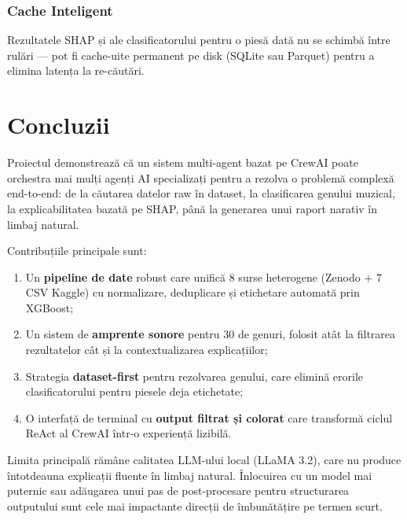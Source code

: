 \documentclass[12pt,a4paper]{report}
\begin{document}
\subsection{Cache Inteligent}

Rezultatele SHAP și ale clasificatorului pentru o piesă dată nu se schimbă
între rulări — pot fi cache-uite permanent pe disk (SQLite sau Parquet) pentru
a elimina latența la re-căutări.

\chapter{Concluzii}

Proiectul demonstrează că un sistem multi-agent bazat pe CrewAI poate orchestra
mai mulți agenți AI specializați pentru a rezolva o problemă complexă end-to-end:
de la căutarea datelor raw în dataset, la clasificarea genului muzical, la
explicabilitatea bazată pe SHAP, până la generarea unui raport narativ în limbaj
natural.

Contribuțiile principale sunt:
\begin{enumerate}
    \item Un \textbf{pipeline de date} robust care unifică 8 surse heterogene
          (Zenodo + 7 CSV Kaggle) cu normalizare, deduplicare și etichetare
          automată prin XGBoost;
    \item Un sistem de \textbf{amprente sonore} pentru 30 de genuri, folosit
          atât la filtrarea rezultatelor cât și la contextualizarea explicațiilor;
    \item Strategia \textbf{dataset-first} pentru rezolvarea genului, care elimină
          erorile clasificatorului pentru piesele deja etichetate;
    \item O interfață de terminal cu \textbf{output filtrat și colorat} care
          transformă ciclul ReAct al CrewAI într-o experiență lizibilă.
\end{enumerate}

Limita principală rămâne calitatea LLM-ului local (LLaMA 3.2), care nu produce
întotdeauna explicații fluente în limbaj natural. Înlocuirea cu un model mai
puternic sau adăugarea unui pas de post-procesare pentru structurarea outputului
sunt cele mai impactante direcții de îmbunătățire pe termen scurt.
\end{document}
